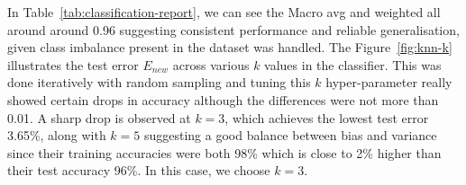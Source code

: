 \documentclass[10pt,twocolumn]{article}
\begin{document}
\begin{table}[H]
\centering
\small  %
\caption{Classification report for 6-class model}
\label{tab:classification-report}
\end{table}

In Table~\ref{tab:classification-report}, we can see the Macro avg and weighted all around around 0.96 suggesting consistent performance and reliable generalisation, given class imbalance present in the dataset was handled.
\clearpage  %
The Figure~\ref{fig:knn-k} illustrates the test error $E_{new}$ across various $k$ values in the classifier. This was done iteratively with random sampling and tuning this $k$ hyper-parameter really showed certain drops in accuracy although the differences were not more than 0.01. A sharp drop is observed at $k=3$, which achieves the lowest test error 3.65\%, along with $k=5$ suggesting a good balance between bias and variance since their training accuracies were both 98\% which is close to 2\% higher than their test accuracy 96\%.  In this case, we choose $k=3$.
\end{document}

